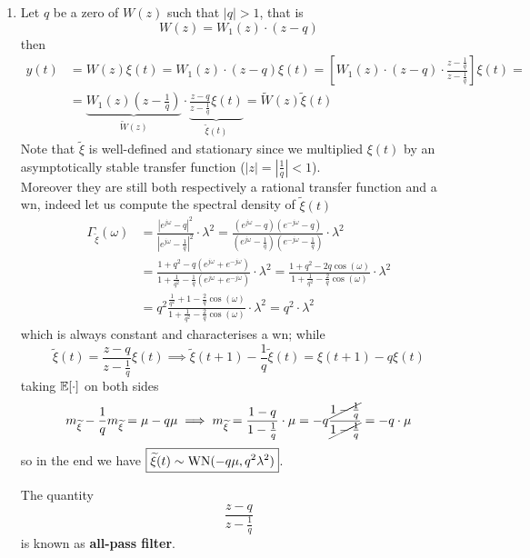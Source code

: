 \begin{enumerate}
	\item 
	Let $q$ be a zero of $W(z)$ such that $|q|>1$, that is
	\[
		W(z)=W_{1}(z)\cdot(z-q)
	\]
	then
	\begin{align*}
		y(t)&=W(z) \xi(t)=W_{1}(z) \cdot(z-q) \xi(t)=\left[W_{1}(z) \cdot(z-q) \cdot \frac{z-\frac{1}{q}}{z-\frac{1}{q}}\right] \xi(t)= \\
		&=\underbrace{W_{1}(z)\left(z-\frac{1}{q}\right)}_{\tilde{W}(z)}\cdot\underbrace{\frac{z-q}{z-\frac{1}{q}} \xi(t)}_{\tilde{\xi}(t)} = \tilde{W}(z) \tilde{\xi}(t)
	\end{align*}
	Note that $\tilde{\xi}$ is well-defined and stationary since we multiplied $\xi(t)$ by an asymptotically stable transfer function ($|z|=\left|\frac{1}{q}\right|<1$).\\
	Moreover they are still both respectively a rational transfer function and a \gls{wn}, indeed let us compute the spectral density of $\tilde{\xi}(t)$
	\begin{align*}
		\Gamma_{\tilde\xi}(\omega) &=\frac{\left|e^{j \omega}-q\right|^{2}}{\left|e^{j \omega}-\frac{1}{q}\right|^{2}} \cdot \lambda^{2}=\frac{\left(e^{j \omega}-q\right)\left(e^{-j \omega}-q\right)}{\left(e^{j \omega}-\frac{1}{q}\right)\left(e^{-j \omega}-\frac{1}{q}\right)} \cdot \lambda^{2}\\
		&=\frac{1+q^{2}-q\left(e^{j \omega}+e^{-j \omega}\right)}{1+\frac{1}{q^{2}}-\frac{1}{q}\left(e^{j \omega}+e^{-j \omega}\right)} \cdot \lambda^{2}=\frac{1+q^{2}-2 q \cos (\omega)}{1+\frac{1}{q^{2}}-\frac{2}{q} \cos (\omega)} \cdot \lambda^{2}\\
		&=q^{2} \frac{\frac{1}{q^{2}}+1-\frac{2}{q} \cos (\omega)}{1+\frac{1}{q^{2}}-\frac{2}{q} \cos (\omega)} \cdot \lambda^{2}=q^{2} \cdot \lambda^{2}
	\end{align*}
	which is always constant and characterises a \gls{wn}; while
	\[
		\boxed{\tilde \xi(t) = \frac{z-q}{z-\frac{1}{q}} \xi(t)} \implies \tilde \xi(t+1)-\frac{1}{q}\tilde \xi(t)=\xi(t+1)-q\xi(t)
	\]
	taking $\E[\cdot]$ on both sides
	\[
		m_{\tilde\xi} - \frac{1}{q} m_{\tilde\xi} = \mu - q\mu \implies m_{\tilde\xi} = \frac{1-q}{1-\frac{1}{q}} \cdot \mu = -q \frac{\cancel{1-\frac{1}{q}}}{\cancel{1-\frac{1}{q}}}=  - q \cdot \mu
	\]
	so in the end we have $\boxed{\tilde\xi(t)\sim \WN(-q\mu,q^2 \lambda^2 )}$.

	The quantity
	\[
		\boxed{\frac{z-q}{z-\frac{1}{q}}}
	\]
	is known as \textbf{all-pass filter}.
\end{enumerate}